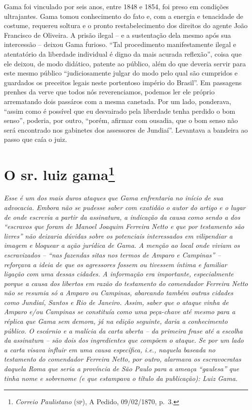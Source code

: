\begin{argumento}
{Gama foi vinculado por seis anos, entre 1848 e 1854, foi preso em
condições ultrajantes. Gama tomou conhecimento do fato e, com a energia
e tenacidade de costume, requereu soltura e o pronto restabelecimento
dos direitos do agente João Francisco de Oliveira. A prisão ilegal -- e
a sustentação dela mesmo após sua intercessão -- deixou Gama furioso.
``Tal procedimento manifestamente ilegal e atentatório da liberdade
individual é digno da mais acurada reflexão'', coisa que ele deixou, de
modo didático, patente ao público, além do que deveria servir para este
mesmo público ``judiciosamente julgar do modo pelo qual são cumpridos e
guardados os preceitos legais neste portentoso império do Brasil''. Em
passagens prenhes da verve que todos nós reverenciamos, podemos ler ele
próprio arrematando dois passáros com a mesma canetada. Por um lado,
ponderava, ``assim como é possível que eu desvairado pela liberdade tenha
perdido o bom senso'', poderia, por outro, ``porém, afirmar com ousadia,
que o bom senso não será encontrado nos gabinetes dos assessores de
Jundiaí''. Levantava a bandeira ao passo que caía o juiz.}
\end{argumento}

\chapter{O sr. luiz gama\footnote{\emph{Correio Paulistano} (\textsc{sp}), A Pedido, 09/02/1870,
  p.~3.}} %

\begin{didascalia}
\emph{Esse é um dos mais duros ataques que Gama enfrentaria no início de
sua advocacia. Embora não se pudesse saber com exatidão o autor do
artigo e o lugar de onde escrevia a partir da assinatura, a indicação da
causa como sendo a dos ``escravos que foram de Manoel Joaquim Ferreira
Netto e que por testamento são livres'' não deixaria dúvidas sobre os
potenciais interessados em vilipendiar a imagem e bloquear a ação
jurídica de Gama. A menção ao local onde viviam os escravizados -- ``nas
fazendas sitas nos termos de Amparo e Campinas'' -- reforçava a ideia de
que os agressores fossem ou tivessem íntima e familiar ligação com uma
dessas cidades. A informação era importante, especialmente porque a
causa dos libertos em razão do testamento do comendador Ferreira Netto
não se resumia só a Amparo ou Campinas, abarcando também outras cidades
como Jundiaí, Santos e Rio de Janeiro. Assim, saber que o ataque vinha
de Amparo e/ou Campinas se constituía como uma peça-chave até mesmo para
a réplica que Gama sem demora, já na edição seguinte, daria a
conhecimento público. O escárnio e a malícia da carta aberta -- da
primeira frase até a escolha da assinatura -- são dois dos ingredientes
que compõem o ataque. Se por um lado a carta visava influir em uma causa
específica, i.e., naquela baseada no testamento do comendador Ferreira
Netto, por outro, alarmava os escravocratas daquela Roma que seria a
província de São Paulo para a ameaça ``gaulesa'' que tinha nome e sobrenome
(e que estampava o título da publicação): Luiz Gama.}
\end{didascalia}


